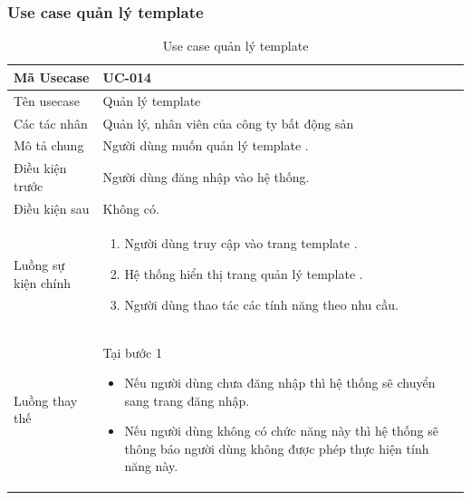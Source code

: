 \documentclass[12pt,a4paper]{article}
\begin{document}
    \subsubsection*{Use case quản lý template }
    \begin{table}[H]
        \centering
        \begin{tabular}{|p{3.5cm}|p{11.5cm}|c|}
            \hline
            Mã Usecase      & UC-014                                      \\
            \hline
            Tên usecase     & Quản lý template                            \\
            \hline
            Các tác nhân    & Quản lý, nhân viên của công ty bất động sản \\
            \hline
            Mô tả chung     & Người dùng muốn quản lý template .          \\
            \hline

            Điều kiện trước & Người dùng đăng nhập vào hệ thống.          \\
            \hline

            Điều kiện sau   & Không có.                                   \\
            \hline

            Luồng sự kiện chính & \vspace{-.8cm}\begin{enumerate}
                                                    \item Người dùng truy cập vào trang template .
                                                    \item Hệ thống hiển thị trang quản lý template .
                                                    \item Người dùng thao tác các tính năng theo nhu cầu.
            \end{enumerate}
            \\
            \hline
            Luồng thay thế & Tại bước 1\newline
            \vspace{-.8cm}\begin{itemize}
                              \item Nếu người dùng chưa đăng nhập thì hệ thống sẽ chuyển sang trang đăng nhập.
                              \item Nếu người dùng không có chức năng này thì hệ thống sẽ thông báo người dùng không được phép thực hiện tính năng này.
            \end{itemize}

            \\ \hline
        \end{tabular}
        \caption{Use case quản lý template }

    \end{table}
\end{document}
